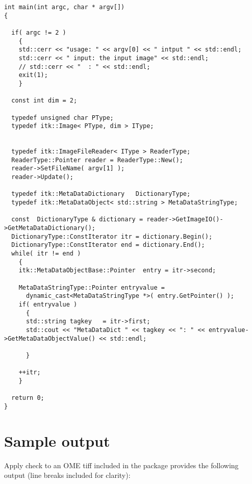 \documentclass{InsightArticle}
\begin{document}
\small \begin{verbatim}
int main(int argc, char * argv[])
{

  if( argc != 2 )
    {
    std::cerr << "usage: " << argv[0] << " intput " << std::endl;
    std::cerr << " input: the input image" << std::endl;
    // std::cerr << "  : " << std::endl;
    exit(1);
    }

  const int dim = 2;
  
  typedef unsigned char PType;
  typedef itk::Image< PType, dim > IType;


  typedef itk::ImageFileReader< IType > ReaderType;
  ReaderType::Pointer reader = ReaderType::New();
  reader->SetFileName( argv[1] );
  reader->Update();

  typedef itk::MetaDataDictionary   DictionaryType;
  typedef itk::MetaDataObject< std::string > MetaDataStringType;

  const  DictionaryType & dictionary = reader->GetImageIO()->GetMetaDataDictionary();
  DictionaryType::ConstIterator itr = dictionary.Begin();
  DictionaryType::ConstIterator end = dictionary.End();
  while( itr != end )
    {
    itk::MetaDataObjectBase::Pointer  entry = itr->second;

    MetaDataStringType::Pointer entryvalue = 
      dynamic_cast<MetaDataStringType *>( entry.GetPointer() );
    if( entryvalue )
      {
      std::string tagkey   = itr->first;
      std::cout << "MetaDataDict " << tagkey << ": " << entryvalue->GetMetaDataObjectValue() << std::endl;

      }

    ++itr;
    }

  return 0;
}
\end{verbatim} \normalsize

\section{Sample output}
Apply check to an OME tiff included in the package provides the following output (line breaks included for clarity):
\end{document}
